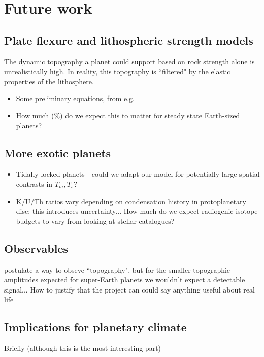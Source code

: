\section{Future work}

\subsection{Plate flexure and lithospheric strength models}

The dynamic topography a planet could support based on rock strength alone is unrealistically high. In reality, this topography is ``filtered" by the elastic properties of the lithosphere. 

\begin{itemize}
\item Some preliminary equations, from e.g. \citet{Golle2012}
\item How much (\%) do we expect this to matter for steady state Earth-sized planets?
\end{itemize}

\subsection{More exotic planets}

\begin{itemize}
\item Tidally locked planets - could we adapt our model for potentially large spatial contrasts in $T_m, T_s$?
\item K/U/Th ratios vary depending on condensation history in protoplanetary disc; this introduces uncertainty... How much do we expect radiogenic isotope budgets to vary from looking at stellar catalogues?
\end{itemize}


\subsection{Observables}

\citet{McTier2018} postulate a way to obseve ``topography", but for the smaller topographic amplitudes expected for super-Earth planets we wouldn't expect a detectable signal...  How to justify that the project can could say anything useful about real life

\subsection{Implications for planetary climate}

Briefly (although this is the most interesting part)

